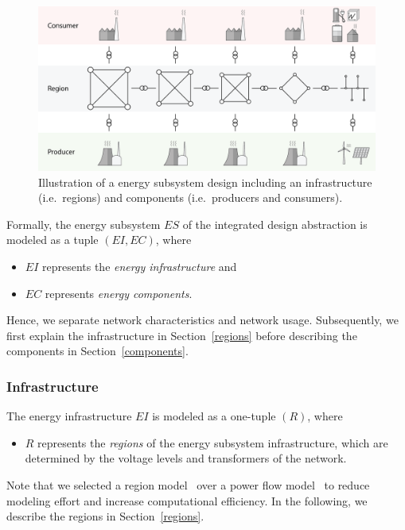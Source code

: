 \begin{figure}[h]
	\begin{center}
	\includegraphics[trim=0 10 0 15, width=0.95\columnwidth]{./gfx/energy_system.png}
	\caption{Illustration of a energy subsystem design including an infrastructure (i.e.\ regions) and components (i.e.\ producers and consumers).}
	\label{energy_illustration}
	\end{center}
\end{figure}

Formally, the energy subsystem $ES$ of the integrated design abstraction is modeled as a tuple $(EI, EC)$, where
\begin{itemize}
	\item $EI$ represents the \textit{energy infrastructure} and
	\item $EC$ represents \textit{energy components}.
\end{itemize}
Hence, we separate network characteristics and network usage. Subsequently, we first explain the infrastructure in Section~\ref{regions} before describing the components in Section~\ref{components}.

\subsubsection{Infrastructure}
\label{energy_infrastructure}

The energy infrastructure $EI$ is modeled as a one-tuple $(R)$, where
\begin{itemize}
	\item $R$ represents the \textit{regions} of the energy subsystem infrastructure, which are determined by the voltage levels and transformers of the network.
\end{itemize}
Note that we selected a region model~\cite{Hackenberg2012} over a power flow model~\cite{Dommel1968} to reduce modeling effort and increase computational efficiency. In the following, we describe the regions in Section~\ref{regions}.

